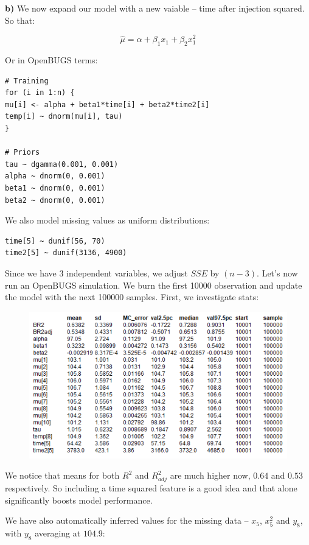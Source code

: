 \documentclass[a4 paper]{article}
\begin{document}
\textbf{b)} We now expand our model 
with a new vaiable -- 
time after injection squared. So that:

$$
\hat{\mu}=\alpha+\beta_1 x_{1} +\beta_2 x_{1}^2
$$

Or in OpenBUGS terms:

\begin{Verbatim}
# Training
for (i in 1:n) {
mu[i] <- alpha + beta1*time[i] + beta2*time2[i]
temp[i] ~ dnorm(mu[i], tau)	
}

# Priors
tau ~ dgamma(0.001, 0.001)
alpha ~ dnorm(0, 0.001)
beta1 ~ dnorm(0, 0.001)
beta2 ~ dnorm(0, 0.001)
\end{Verbatim}


We also model missing values
as uniform distributions:

\begin{Verbatim}
time[5] ~ dunif(56, 70)
time2[5] ~ dunif(3136, 4900)
\end{Verbatim} 



Since we have 3 independent variables, 
we adjust $SSE$ by $(n-3)$.
Let's now run an OpenBUGS simulation. We burn
the first 10000 observation and update the model 
with the next 100000 samples. First, we 
investigate stats:

\begin{figure}[H]
	\includegraphics[scale=1.0]{q1_3}
	\centering
	\label{q1_3}
\end{figure}


We notice that means for both $R^2$ and $R^2_{adj}$
are much higher now, $0.64$ and $0.53$ respectively.
So including a time squared feature is a good 
idea and that alone significantly boosts model
performance.

We have also 
automatically inferred values for the 
missing data -- $x_5$, $x_5^2$ and $y_8$, 
with $y_8$ averaging at $104.9$: 
\end{document}
